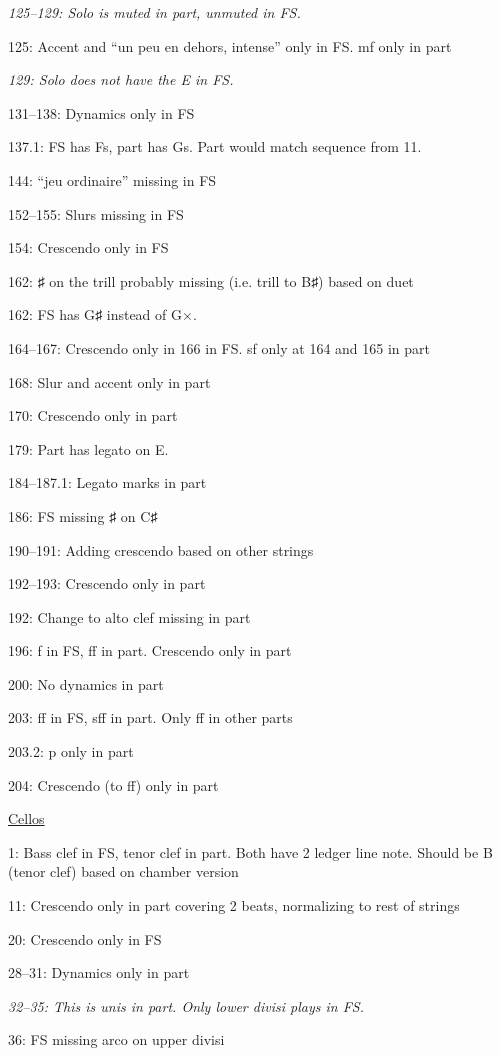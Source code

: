 \documentclass[twoside]{article}
\begin{document}
\begin{hangparas}{15pt}{1}
\begin{multicols}{2}
\textit{125--129: Solo is muted in part, unmuted in FS.}

125: Accent and ``un peu en dehors, intense'' only in FS. mf only in part

\textit{129: Solo does not have the E in FS.}

131--138: Dynamics only in FS

137.1: FS has Fs, part has Gs. Part would match sequence from 11.

144: ``jeu ordinaire'' missing in FS

152--155: Slurs missing in FS

154: Crescendo only in FS

162: ♯ on the trill probably missing (i.e. trill to B♯) based on duet

162: FS has G♯ instead of G$\times$.

164--167: Crescendo only in 166 in FS. sf only at 164 and 165 in part

168: Slur and accent only in part

170: Crescendo only in part

179: Part has legato on E.

184--187.1: Legato marks in part

186: FS missing ♯ on C♯

190--191: Adding crescendo based on other strings

192--193: Crescendo only in part

192: Change to alto clef missing in part

196: f in FS, ff in part. Crescendo only in part

200: No dynamics in part

203: ff in FS, sff in part. Only ff in other parts

203.2: p only in part

204: Crescendo (to ff) only in part

\underline{Cellos}

1: Bass clef in FS, tenor clef in part. Both have 2 ledger line note. Should be B (tenor clef) based on chamber version

11: Crescendo only in part covering 2 beats, normalizing to rest of strings

20: Crescendo only in FS

28--31: Dynamics only in part

\textit{32--35: This is unis in part. Only lower divisi plays in FS.}

36: FS missing arco on upper divisi


\end{multicols}
\end{hangparas}
\end{document}
